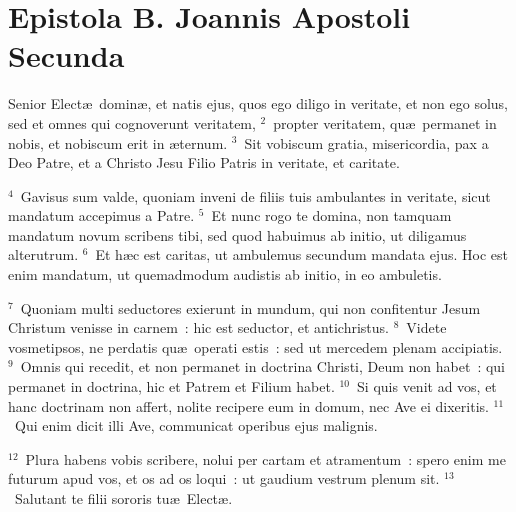 \clearpage
{\centering \section*{Epistola B. Joannis Apostoli Secunda}}\thispagestyle{empty}

\noindent Senior Elect\ae\ domin\ae , et natis ejus, quos ego diligo in veritate, et non ego solus, sed et omnes qui cognoverunt veritatem,
${}^{2}$~propter veritatem, qu\ae\ permanet in nobis, et nobiscum erit in \ae ternum.
${}^{3}$~Sit vobiscum gratia, misericordia, pax a Deo Patre, et a Christo Jesu Filio Patris in veritate, et caritate.


${}^{4}$~Gavisus sum valde, quoniam inveni de filiis tuis ambulantes in veritate, sicut mandatum accepimus a Patre.
${}^{5}$~Et nunc rogo te domina, non tamquam mandatum novum scribens tibi, sed quod habuimus ab initio, ut diligamus alterutrum.
${}^{6}$~Et h\ae c est caritas, ut ambulemus secundum mandata ejus. Hoc est enim mandatum, ut quemadmodum audistis ab initio, in eo ambuletis.


${}^{7}$~Quoniam multi seductores exierunt in mundum, qui non confitentur Jesum Christum venisse in carnem~: hic est seductor, et antichristus.
${}^{8}$~Videte vosmetipsos, ne perdatis qu\ae\ operati estis~: sed ut mercedem plenam accipiatis.
${}^{9}$~Omnis qui recedit, et non permanet in doctrina Christi, Deum non habet~: qui permanet in doctrina, hic et Patrem et Filium habet.
${}^{10}$~Si quis venit ad vos, et hanc doctrinam non affert, nolite recipere eum in domum, nec Ave ei dixeritis.
${}^{11}$~Qui enim dicit illi Ave, communicat operibus ejus malignis.


${}^{12}$~Plura habens vobis scribere, nolui per cartam et atramentum~: spero enim me futurum apud vos, et os ad os loqui~: ut gaudium vestrum plenum sit.
${}^{13}$~Salutant te filii sororis tu\ae\ Elect\ae .
